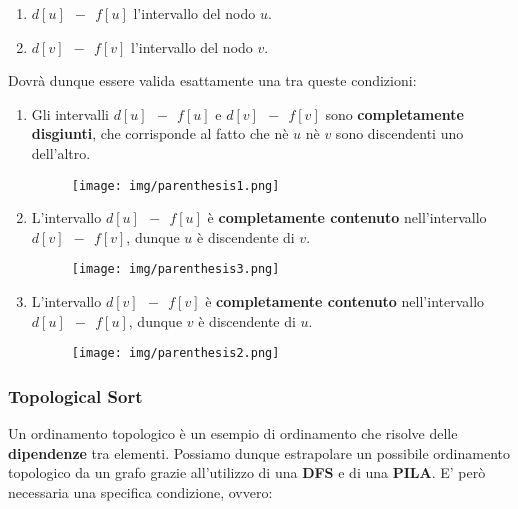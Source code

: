\documentclass{article}
\begin{document}
\begin{enumerate}
    \item $d[u] \: \: - \: \: f[u] $ l'intervallo del nodo $u$.
    \item $d[v] \: \: - \: \: f[v] $ l'intervallo del nodo $v$.
\end{enumerate}

Dovrà dunque essere valida esattamente una tra queste condizioni:

\vskip 1cm

\begin{enumerate}
    \item Gli intervalli $d[u] \: \: - \: \: f[u] $ e $d[v] \: \: - \: \: f[v] $ sono \textbf{completamente disgiunti}, che corrisponde al fatto che nè $u$ nè $v$ sono discendenti uno dell'altro.

    \begin{figure}[htbp]
        \center
        \texttt{[image: img/parenthesis1.png]}
    \end{figure}

    \vskip 2cm
    
    \item L'intervallo $d[u] \: \: - \: \: f[u]$ è \textbf{completamente contenuto} nell'intervallo $d[v] \: \: - \: \: f[v]$, dunque $u$ è discendente di $v$.

    \begin{figure}[htbp]
        \center
        \texttt{[image: img/parenthesis3.png]}
    \end{figure}

    \vskip 2cm
    
    \item L'intervallo $d[v] \: \: - \: \: f[v]$ è \textbf{completamente contenuto} nell'intervallo $d[u] \: \: - \: \: f[u]$, dunque $v$ è discendente di $u$.

    \begin{figure}[htbp]
        \center
        \texttt{[image: img/parenthesis2.png]}
    \end{figure}
    
\end{enumerate}

\newpage

\subsubsection{Topological Sort}

Un ordinamento topologico è un esempio di ordinamento che risolve delle \textbf{dipendenze} tra elementi. Possiamo dunque estrapolare un possibile ordinamento topologico da un grafo grazie all'utilizzo di una \textbf{DFS} e di una \textbf{PILA}. E' però necessaria una specifica condizione, ovvero:
\end{document}
